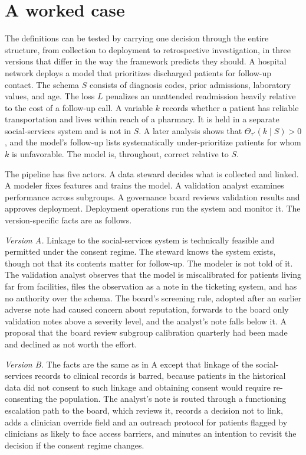 \documentclass[11pt]{article}
\newcommand{\Th}{\Theta}
\theoremstyle{plain}
\theoremstyle{definition}
\begin{document}
\section{A worked case}

The definitions can be tested by carrying one decision through the entire structure, from collection to deployment to retrospective investigation, in three versions that differ in the way the framework predicts they should. A hospital network deploys a model that prioritizes discharged patients for follow-up contact. The schema $S$ consists of diagnosis codes, prior admissions, laboratory values, and age. The loss $L$ penalizes an unattended readmission heavily relative to the cost of a follow-up call. A variable $k$ records whether a patient has reliable transportation and lives within reach of a pharmacy. It is held in a separate social-services system and is not in $S$. A later analysis shows that $\Th_{\tau'}(k\mid S)>0$, and the model's follow-up lists systematically under-prioritize patients for whom $k$ is unfavorable. The model is, throughout, correct relative to $S$.

The pipeline has five actors. A data steward decides what is collected and linked. A modeler fixes features and trains the model. A validation analyst examines performance across subgroups. A governance board reviews validation results and approves deployment. Deployment operations run the system and monitor it. The version-specific facts are as follows.

\emph{Version A.} Linkage to the social-services system is technically feasible and permitted under the consent regime. The steward knows the system exists, though not that its contents matter for follow-up. The modeler is not told of it. The validation analyst observes that the model is miscalibrated for patients living far from facilities, files the observation as a note in the ticketing system, and has no authority over the schema. The board's screening rule, adopted after an earlier adverse note had caused concern about reputation, forwards to the board only validation notes above a severity level, and the analyst's note falls below it. A proposal that the board review subgroup calibration quarterly had been made and declined as not worth the effort.

\emph{Version B.} The facts are the same as in A except that linkage of the social-services records to clinical records is barred, because patients in the historical data did not consent to such linkage and obtaining consent would require re-consenting the population. The analyst's note is routed through a functioning escalation path to the board, which reviews it, records a decision not to link, adds a clinician override field and an outreach protocol for patients flagged by clinicians as likely to face access barriers, and minutes an intention to revisit the decision if the consent regime changes.
\end{document}
